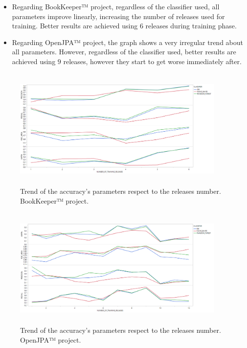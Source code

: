 \documentclass[sigconf]{acmart}
\begin{document}
\begin{itemize}
\item Regarding BookKeeper™ project, regardless of the classifier used, all parameters improve linearly, increasing the number of releases used for training. Better results are achieved using $6$ releases during training phase.  

\item Regarding OpenJPA™ project, the graph shows a very irregular trend about all parameters. However, regardless of the classifier used, better results are achieved using $9$ releases, however they start to get worse immediately after.
\end{itemize}

\begin{figure}
  \centering
  \includegraphics[width=10.5cm, height=6cm]{./BOOKKEEPER/History.png}
  \caption{Trend of the accuracy's parameters respect to the releases number. \newline BookKeeper™ project. \newline}
  \label{BOOKKEEPER-History}
\end{figure}

\begin{figure}
  \centering
  \includegraphics[width=10.5cm, height=6cm]{./OPENJPA/History.png}
  \caption{Trend of the accuracy's parameters respect to the releases number. \newline OpenJPA™ project.}
  \label{OPENJPA-History}
\end{figure}
\end{document}
